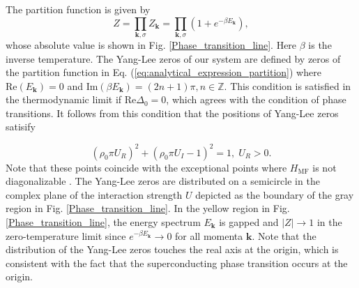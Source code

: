 \documentclass[aps,prl,twocolumn,superscriptaddress]{revtex4-1}
\begin{document}
\begin{bibunit}[apsrev4-2]
The partition function is given by
\begin{equation}
Z=\prod_{\bm{k},\sigma}Z_{\bm{k}}=\prod_{\bm{k},\sigma}(1+e^{-\beta E_{\bm{k}}}),\label{eq:analytical_expression_partition}
\end{equation}
whose absolute value is shown in Fig. \ref{Phase_transition_line}. Here $\beta$ is the inverse temperature. 
The Yang-Lee zeros of our system are defined by zeros of the
partition function in Eq. (\ref{eq:analytical_expression_partition})
where $\mathrm{Re}(E_{\bm{k}})=0$ and $\mathrm{Im}(\beta E_{\bm{k}})=(2n+1)\pi,n\in\mathbb{Z}$.
This condition is satisfied in the thermodynamic limit if $\mathrm{Re}\Delta_0=0$,
which agrees with the condition of phase transitions. It follows from this condition that the positions of Yang-Lee zeros satisify

\begin{equation}
(\rho_{0}\pi U_{R})^{2}+(\rho_{0}\pi U_{I}-1)^{2}=1,\;U_{R}>0.\label{eq:phase_transition}
\end{equation}
Note that these points coincide with the exceptional points where $H_{\mathrm{MF}}$
is not diagonalizable \cite{Yamamoto2019}. The Yang-Lee
zeros are distributed on a semicircle in the complex plane of the interaction strength $U$
depicted as the boundary of the gray region in Fig. \ref{Phase_transition_line}. In the yellow region in Fig. \ref{Phase_transition_line}, the energy spectrum $E_{\mathbf{k}}$ is gapped and $|Z|\to 1$ in the zero-temperature limit since $e^{-\beta E_{\bm{k}}}\to 0$ for all momenta $\bm{k}$. Note that the distribution of the Yang-Lee zeros touches the real axis at the origin, which is consistent with the fact that the superconducting phase transition occurs at the origin.


\end{bibunit}
\end{document}

